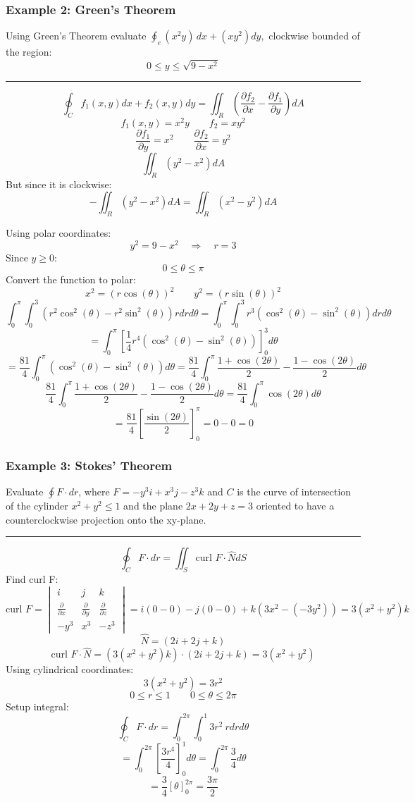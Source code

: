 \subsubsection{Example 2: Green's Theorem}
Using Green's Theorem evaluate $\oint_{e}(x^{2}y)\,d x+(x y^{2})d y,$ clockwise bounded of the region:
$$0\leq y\leq{\sqrt{9-x^{2}}}$$

\rule{\textwidth}{0.5pt}

$$\oint_{ C } f_1(x, y) d x+f_2(x, y) d y=\iint_{ R }\left(\frac{\partial f_2}{\partial x}-\frac{\partial f_1}{\partial y}\right) d A$$
$$f_1(x,y)=x^2y\qquad f_2=xy^2$$
$$\frac{\partial f_1}{\partial y}=x^2 \qquad \frac{\partial f_2}{\partial x}=y^2$$
$$\iint_{ R }\left(y^2-x^2\right) d A$$
But since it is clockwise:
$$-\iint_{ R }\left(y^2-x^2\right) d A=\iint_{ R }\left(x^2-y^2\right) d A$$

Using polar coordinates:
$$y^2=9-x^2\quad\Rightarrow\quad r=3$$
Since $y\geq 0$:
$$0\leq\theta\leq\pi$$
Convert the function to polar:
$$x^2=(r\cos(\theta))^2\qquad y^2=(r\sin(\theta))^2$$
$$\int_0^\pi\int_0^3(r^2\cos^2(\theta)-r^2\sin^2(\theta))rdrd\theta =\int_0^\pi\int_0^3r^3(\cos^2(\theta)-\sin^2(\theta))drd\theta$$
$$=\int_0^\pi\left[\frac{1}{4}r^4(\cos^2(\theta)-\sin^2(\theta))\right]_0^3d\theta$$
$$=\frac{81}{4}\int_0^\pi(\cos^2(\theta)-\sin^2(\theta))d\theta=\frac{81}{4}\int_0^\pi\frac{1+\cos(2\theta)}{2}-\frac{1-\cos(2\theta)}{2} d\theta$$
$$\frac{81}{4}\int_0^\pi\frac{1+\cos(2\theta)}{2}-\frac{1-\cos(2\theta)}{2} d\theta=\frac{81}{4}\int_0^\pi \cos(2\theta) d\theta$$
$$=\frac{81}{4}\left[\frac{\sin(2\theta)}{2}\right]_0^\pi=0-0=0$$


\subsubsection{Example 3: Stokes' Theorem}
Evaluate $\oint F\cdot dr$, where $F=-y^3i+x^3j-z^3k$ and $C$ is the curve of intersection of the cylinder
$x^2+y^2\leq 1$ and the plane $2x+2y+z=3$ oriented to have a counterclockwise projection onto the xy-plane.

\rule{\textwidth}{0.5pt}

$$\oint_{C}F\cdot dr=\iint_{S}\text{curl }F\cdot\widehat{N}dS$$
Find curl F:
$$\text{curl }F=
\begin{vmatrix}
  i&j&k\\
\frac{ \partial  }{ \partial x } & \frac{ \partial  }{ \partial y } & \frac{ \partial  }{ \partial z } \\
-y^3&x^3&-z^3
\end{vmatrix}
=i(0-0)-j(0-0)+k(3x^2-(-3y^2))=3(x^2+y^2)k
$$
$$\widehat{N}=(2i+2j+k)$$
$$\text{curl }F\cdot \widehat{N}=(3(x^2+y^2)k)\cdot (2i+2j+k)=3(x^2+y^2)$$
Using cylindrical coordinates:
$$3(x^2+y^2)=3r^2$$
$$0\leq r\leq 1\qquad 0\leq\theta\leq 2\pi$$
Setup integral:
$$\oint_{C}F\cdot dr=\int_{0}^{2\pi}\int_0^1 3r^2\ rdrd\theta$$
$$=\int_{0}^{2\pi}\left[\frac{3r^4}{4}\right]_0^1d\theta=\int_{0}^{2\pi}\frac{3}{4}d\theta$$
$$=\frac{3}{4}\left[ \theta \right]_0^{2\pi}=\boxed{\frac{3\pi}{2}}$$

